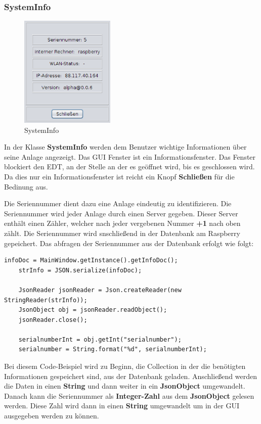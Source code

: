 \subsubsection{SystemInfo}
\begin{figure}
\vspace{-20pt}
  \begin{center}
    \includegraphics[width=0.40\textwidth]{Bilder/GUI/SystemInfo}
  \end{center}
  \caption{SystemInfo}
  \label{SystemInfo}
  \vspace{-70pt}
\end{figure}
   
In der Klasse \textbf{SystemInfo} werden dem Benutzer wichtige Informationen über seine Anlage angezeigt. Das GUI Fenster ist ein Informationsfenster. Das Fenster blockiert den EDT, an der Stelle an der es geöffnet wird, bis es geschlossen wird. Da dies nur ein Informationsfenster ist reicht ein Knopf \textbf{Schließen} für die Bedinung aus.

\vspace{10pt}

Die Seriennummer dient dazu eine Anlage eindeutig zu identifizieren. Die Seriennummer wird jeder Anlage durch einen Server gegeben. Dieser Server enthält einen Zähler, welcher nach jeder vergebenen Nummer \textbf{+1} nach oben zählt. Die Seriennummer wird snschließend in der Datenbank am Raspberry gepeichert. Das abfragen der Seriennummer aus der Datenbank erfolgt wie folgt:
\vspace{40pt}
\begin{lstlisting}[style=JavaStyle, caption=Abfragen der Seriennummer]
	infoDoc = MainWindow.getInstance().getInfoDoc();
	strInfo = JSON.serialize(infoDoc);

	JsonReader jsonReader = Json.createReader(new StringReader(strInfo));
	JsonObject obj = jsonReader.readObject();
	jsonReader.close();
        
	serialnumberInt = obj.getInt("serialnumber");
	serialnumber = String.format("%d", serialnumberInt);        
\end{lstlisting}
Bei diesem Code-Beispiel wird zu Beginn, die Collection in der die benötigten Informationen gespeichert sind, aus der Datenbank geladen. Anschließend werden die Daten in einen \textbf{String} und dann weiter in ein \textbf{JsonObject} umgewandelt. Danach kann die Seriennummer als \textbf{Integer-Zahl} aus dem \textbf{JsonObject} gelesen werden. Diese Zahl wird dann in einen \textbf{String} umgewandelt um in der GUI ausgegeben werden zu können.

